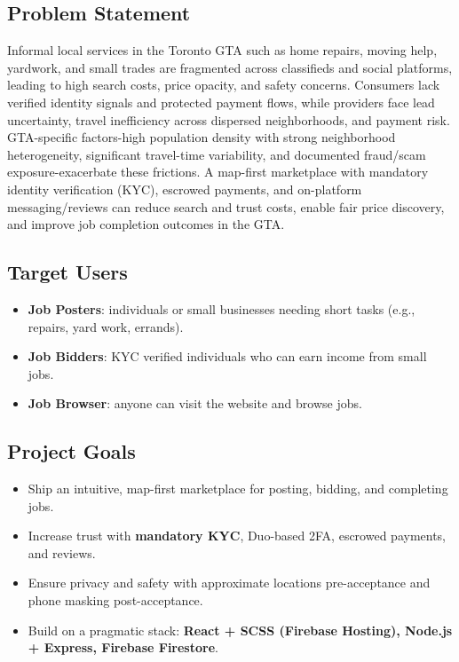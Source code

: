 \documentclass[11pt]{article}
\begin{document}
\subsection*{Problem Statement}
Informal local services in the Toronto GTA such as home repairs, moving help, yardwork, and small trades are fragmented across classifieds and social platforms, leading to high search costs, price opacity, and safety concerns. Consumers lack verified identity signals and protected payment flows, while providers face lead uncertainty, travel inefficiency across dispersed neighborhoods, and payment risk. GTA-specific factors-high population density with strong neighborhood heterogeneity, significant travel-time variability, and documented fraud/scam exposure-exacerbate these frictions. A map-first marketplace with mandatory identity verification (KYC), escrowed payments, and on-platform messaging/reviews can reduce search and trust costs, enable fair price discovery, and improve job completion outcomes in the GTA.

\subsection*{Target Users}
\begin{itemize}[leftmargin=1.4em]
  \item \textbf{Job Posters}: individuals or small businesses needing short tasks (e.g., repairs, yard work, errands).
  \item \textbf{Job Bidders}: KYC verified individuals who can earn income from small jobs.
  \item \textbf{Job Browser}: anyone can visit the website and browse jobs.
\end{itemize}

\subsection*{Project Goals}
\begin{itemize}[leftmargin=1.4em]
  \item Ship an intuitive, map-first marketplace for posting, bidding, and completing jobs.
  \item Increase trust with \textbf{mandatory KYC}, Duo-based 2FA, escrowed payments, and reviews.
  \item Ensure privacy and safety with approximate locations pre-acceptance and phone masking post-acceptance.
  \item Build on a pragmatic stack: \textbf{React + SCSS (Firebase Hosting), Node.js + Express, Firebase Firestore}.
\end{itemize}
\end{document}
